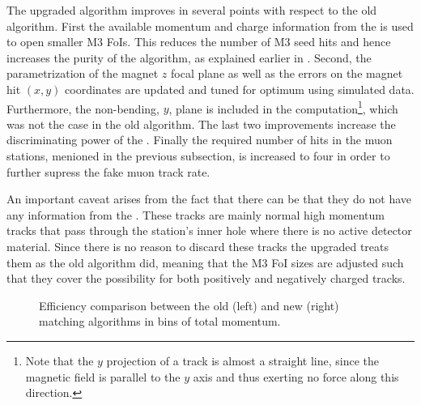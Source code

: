 The upgraded \mvTTm algorithm improves in several points with respect to the old \mvm algorithm.
First the available momentum and charge information from the \ttracker is used to open smaller M3 FoIs.
This reduces the number of M3 seed hits and hence increases the purity of the \mvTTm algorithm,
as explained earlier in . Second, the parametrization of the magnet $z$
focal plane as well as the errors on the magnet hit $(x,y)$ coordinates are updated and tuned for
optimum using simulated data. Furthermore, the non-bending, $y$, plane is included in the \chisq
computation\footnote{Note that the $y$ projection of a track is almost a straight line, since the magnetic
field is parallel to the $y$ axis and thus exerting no force along this direction.}, which was not the
case in the old \mvm algorithm. The last two improvements increase the discriminating power of the \chisq.
Finally the required number of hits in the muon stations, menioned in the previous subsection, is increased
to four in order to further supress the fake muon track rate.

An important caveat arises from the fact that there can be \veloTTracks that they do not have any information from
the \ttracker. These tracks are mainly normal high momentum tracks that pass through the \ttracker station's inner hole
where there is no active detector material. Since there is no reason to discard these tracks the upgraded \mvTTm treats
them as the old \mvm algorithm did, meaning that the M3 FoI sizes are adjusted such that they cover
the possibility for both positively and negatively charged tracks.

\begin{figure}[t]
  \centering
  \begin{subfigure}{0.5\textwidth}
    \raggedright
    \scalebox{.6}{}
    \caption{}
    \label{mvTTm_eff_p}
  \end{subfigure}%
  \hfill%
  \begin{subfigure}{0.5\textwidth}
    \raggedleft
    \scalebox{.6}{}
    \caption{}
    \label{mvm_eff_p}
  \end{subfigure}
  \caption{Efficiency comparison between the old (left) and new (right) matching algorithms in bins of total momentum.}
 \label{mvm_eff_p_comp}
\end{figure}

